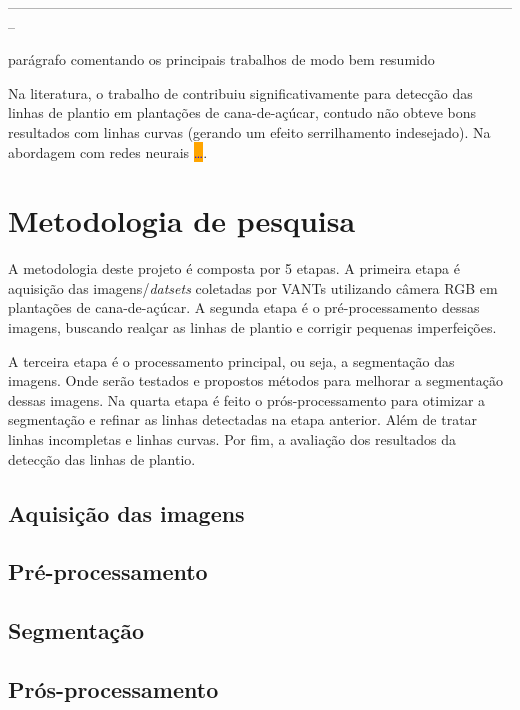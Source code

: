 \documentclass[12pt, a4paper, english, brazil]{article}
\newcommand{\textRed}[1]{{{\color{red} #1}}}
\newcommand{\dotsBlue}{\colorbox{orange}{\textcolor{blue}{\dots}}}
\newcommand{\linePage}{--------------------------------------------------------------------------------------------------------------}
\begin{document}
\linePage


\textRed{parágrafo comentando os principais trabalhos de modo bem resumido}

Na literatura, o trabalho de  contribuiu significativamente para detecção das linhas de plantio em plantações de cana-de-açúcar, contudo não obteve bons resultados com linhas curvas (gerando um efeito serrilhamento indesejado). \textRed{Na abordagem com redes neurais \dotsBlue}.


\section{Metodologia de pesquisa}

A metodologia deste projeto é composta por 5 etapas. A primeira etapa é aquisição das imagens/\textit{datsets} coletadas por VANTs utilizando câmera RGB em plantações de cana-de-açúcar. A segunda etapa é o pré-processamento dessas imagens, buscando realçar as linhas de plantio e corrigir pequenas imperfeições.

A terceira etapa é o processamento principal, ou seja, a segmentação das imagens. Onde serão testados e propostos métodos para melhorar a segmentação dessas imagens. Na quarta etapa é feito o prós-processamento para otimizar a segmentação e refinar as linhas detectadas na etapa anterior. Além de tratar linhas incompletas e linhas curvas. Por fim, a avaliação dos resultados da detecção das linhas de plantio.

\subsection{Aquisição das imagens}
\subsection{Pré-processamento}
\subsection{Segmentação}
\subsection{Prós-processamento}
\end{document}
